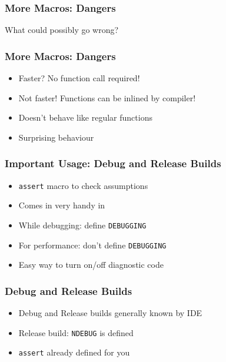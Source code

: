 \documentclass{../ucll-slides}
\begin{document}
\begin{frame}
  \frametitle{More Macros: Dangers}
  \begin{center}
    What could possibly go wrong?
  \end{center}
  \vskip1cm
  \begin{overprint}
  \end{overprint}
\end{frame}

\begin{frame}
  \frametitle{More Macros: Dangers}
  \begin{itemize}
    \item Faster? No function call required!
    \item<2> Not faster! Functions can be inlined by compiler!
  \end{itemize}
  \vskip4mm
  \begin{itemize}
    \item Doesn't behave like regular functions
    \item Surprising behaviour
  \end{itemize}
\end{frame}

\begin{frame}
  \frametitle{Important Usage: Debug and Release Builds}
  \begin{itemize}
    \item {\tt assert} macro to check assumptions
    \item Comes in very handy in  \cpp
    \item While debugging: define {\tt DEBUGGING}
    \item For performance: don't define {\tt DEBUGGING}
    \item Easy way to turn on/off diagnostic code
  \end{itemize}
\end{frame}

\begin{frame}
  \frametitle{Debug and Release Builds}
  \begin{itemize}
    \item Debug and Release builds generally known by IDE
    \item Release build: {\tt NDEBUG} is defined
    \item {\tt assert} already defined for you
  \end{itemize}
\end{frame}
\end{document}
